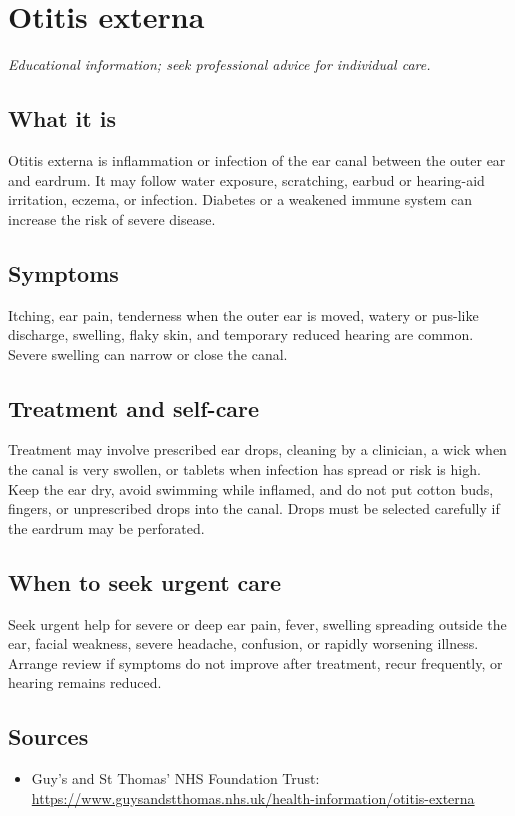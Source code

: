 \chapter{Otitis externa}

\medskip
\noindent\textit{Educational information; seek professional advice for individual care.}

\section*{What it is}
Otitis externa is inflammation or infection of the ear canal between the outer ear and eardrum. It may follow water exposure, scratching, earbud or hearing-aid irritation, eczema, or infection. Diabetes or a weakened immune system can increase the risk of severe disease.

\section*{Symptoms}
Itching, ear pain, tenderness when the outer ear is moved, watery or pus-like discharge, swelling, flaky skin, and temporary reduced hearing are common. Severe swelling can narrow or close the canal.

\section*{Treatment and self-care}
Treatment may involve prescribed ear drops, cleaning by a clinician, a wick when the canal is very swollen, or tablets when infection has spread or risk is high. Keep the ear dry, avoid swimming while inflamed, and do not put cotton buds, fingers, or unprescribed drops into the canal. Drops must be selected carefully if the eardrum may be perforated.

\section*{When to seek urgent care}
Seek urgent help for severe or deep ear pain, fever, swelling spreading outside the ear, facial weakness, severe headache, confusion, or rapidly worsening illness. Arrange review if symptoms do not improve after treatment, recur frequently, or hearing remains reduced.

\section*{Sources}
\begin{itemize}
\item Guy’s and St Thomas’ NHS Foundation Trust: \url{https://www.guysandstthomas.nhs.uk/health-information/otitis-externa}
\end{itemize}
